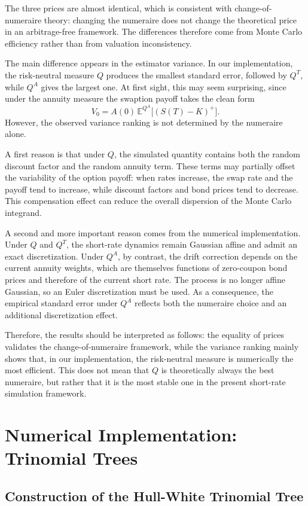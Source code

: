 \documentclass[12pt, a4paper]{article}
\begin{document}
The three prices are almost identical, which is consistent with change-of-numeraire theory:
changing the numeraire does not change the theoretical price in an arbitrage-free framework.
The differences therefore come from Monte Carlo efficiency rather than from valuation inconsistency.

The main difference appears in the estimator variance. In our implementation, the risk-neutral
measure $Q$ produces the smallest standard error, followed by $Q^T$, while $Q^A$ gives the
largest one. At first sight, this may seem surprising, since under the annuity measure the
swaption payoff takes the clean form
\[
V_0 = A(0)\,\mathbb{E}^{Q^A}\big[(S(T)-K)^+\big].
\]
However, the observed variance ranking is not determined by the numeraire alone.

A first reason is that under $Q$, the simulated quantity contains both the random discount factor
and the random annuity term. These terms may partially offset the variability of the option payoff:
when rates increase, the swap rate and the payoff tend to increase, while discount factors and bond
prices tend to decrease. This compensation effect can reduce the overall dispersion of the Monte Carlo
integrand.

A second and more important reason comes from the numerical implementation. Under $Q$ and $Q^T$,
the short-rate dynamics remain Gaussian affine and admit an exact discretization. Under $Q^A$,
by contrast, the drift correction depends on the current annuity weights, which are themselves
functions of zero-coupon bond prices and therefore of the current short rate. The process is no
longer affine Gaussian, so an Euler discretization must be used. As a consequence, the empirical
standard error under $Q^A$ reflects both the numeraire choice and an additional discretization effect.

Therefore, the results should be interpreted as follows: the equality of prices validates the
change-of-numeraire framework, while the variance ranking mainly shows that, in our implementation,
the risk-neutral measure is numerically the most efficient. This does not mean that $Q$ is
theoretically always the best numeraire, but rather that it is the most stable one in the present
short-rate simulation framework.
\section{Numerical Implementation: Trinomial Trees}

\subsection{Construction of the Hull-White Trinomial Tree}
\end{document}

